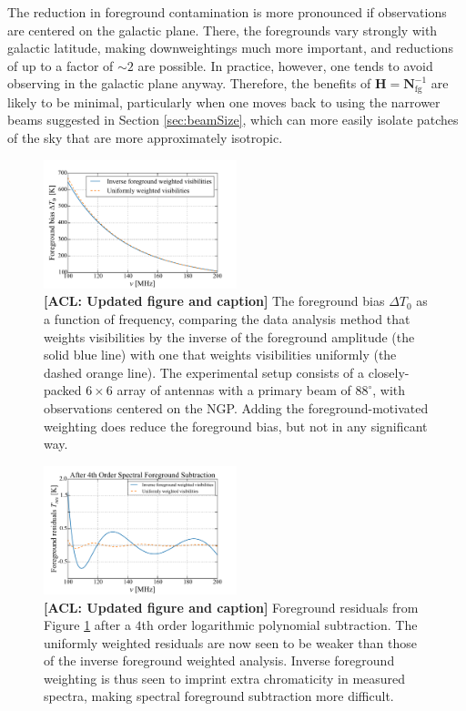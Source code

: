 \documentclass[twocolumn,apj,numberedappendix]{emulateapj}
\newcommand{\Hmat}{\mathbf{H}}
\newcommand{\Nfg}{\mathbf{N}_{\textrm{fg}}}
\newcommand{\acl}[1]{{\color{red} \textbf{[ACL:  #1]}}}
\begin{document}
The reduction in foreground contamination is more pronounced if observations are centered on the galactic plane. There, the foregrounds vary strongly with galactic latitude, making downweightings much more important, and reductions of up to a factor of $\sim 2$ are possible. In practice, however, one tends to avoid observing in the galactic plane anyway. Therefore, the benefits of $\Hmat = \Nfg^{-1}$ are likely to be minimal, particularly when one moves back to using the narrower beams suggested in Section \ref{sec:beamSize}, which can more easily isolate patches of the sky that are more approximately isotropic.

\begin{figure}[h]
	\centering
	\includegraphics[width=0.50\textwidth]{figures/NcomparisonNoSub.pdf}
	\caption{\acl{Updated figure and caption} The foreground bias $\Delta T_0$ as a function of frequency, comparing the data analysis method that weights visibilities by the inverse of the foreground amplitude (the solid blue line) with one that weights visibilities uniformly (the dashed orange line). The experimental setup consists of a closely-packed $6\times 6$ array of antennas with a primary beam of $88^\circ$, with observations centered on the NGP. Adding the foreground-motivated weighting does reduce the foreground bias, but not in any significant way.}
	\label{fig:Ncomparison}
\end{figure}

\begin{figure}[h]
	\centering
	\includegraphics[width=0.50\textwidth]{figures/NcomparisonPoly4.pdf}
	\caption{\acl{Updated figure and caption} Foreground residuals from Figure \ref{fig:Ncomparison} after a $4$th order logarithmic polynomial subtraction. The uniformly weighted residuals are now seen to be weaker than those of the inverse foreground weighted analysis. Inverse foreground weighting is thus seen to imprint extra chromaticity in measured spectra, making spectral foreground subtraction more difficult.}
	\label{fig:NcomparisonPoly4}
\end{figure}
\end{document}
